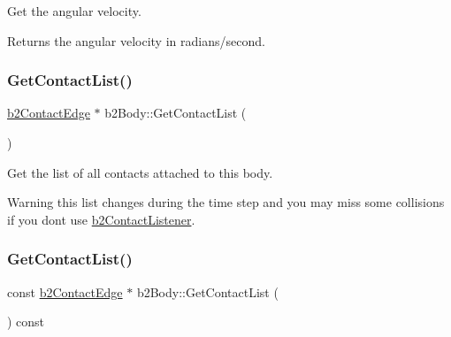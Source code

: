 Get the angular velocity. \begin{DoxyReturn}{Returns}
the angular velocity in radians/second. 
\end{DoxyReturn}
\mbox{\label{classb2_body_a16bdbfb266c82a0ef51be351a8928bc5}} 
\subsubsection{\texorpdfstring{GetContactList()}{GetContactList()}\hspace{0.1cm}{\footnotesize\ttfamily [1/2]}}
{\footnotesize\ttfamily \mbox{\hyperlink{structb2_contact_edge}{b2\+Contact\+Edge}} $\ast$ b2\+Body\+::\+Get\+Contact\+List (\begin{DoxyParamCaption}{ }\end{DoxyParamCaption})\hspace{0.3cm}{\ttfamily [inline]}}

Get the list of all contacts attached to this body. \begin{DoxyWarning}{Warning}
this list changes during the time step and you may miss some collisions if you don\textquotesingle{}t use \mbox{\hyperlink{classb2_contact_listener}{b2\+Contact\+Listener}}. 
\end{DoxyWarning}
\mbox{\label{classb2_body_a137168690469fb838ab89c5f27a7cf43}} 
\subsubsection{\texorpdfstring{GetContactList()}{GetContactList()}\hspace{0.1cm}{\footnotesize\ttfamily [2/2]}}
{\footnotesize\ttfamily const \mbox{\hyperlink{structb2_contact_edge}{b2\+Contact\+Edge}} $\ast$ b2\+Body\+::\+Get\+Contact\+List (\begin{DoxyParamCaption}{ }\end{DoxyParamCaption}) const\hspace{0.3cm}{\ttfamily [inline]}}

\mbox{\label{classb2_body_a64634da20c6e0ab2d68a3cc9ea15efc3}} 
